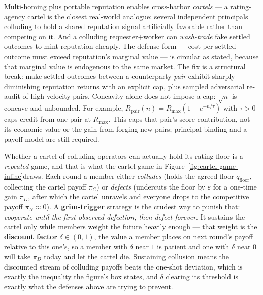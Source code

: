 \documentclass[11pt,a4paper]{article}
\theoremstyle{definition}
\theoremstyle{definition}
\theoremstyle{remark}
\begin{document}
Multi-homing plus portable reputation enables cross-harbor \emph{cartels} --- a
rating-agency cartel is the closest real-world analogue: several independent
principals colluding to hold a shared reputation signal artificially favorable
rather than competing on it. And a colluding requester$+$worker can
\emph{wash-trade} fake settled
outcomes to mint reputation cheaply. The defense form --- cost-per-settled-outcome
must exceed reputation's marginal value --- is circular as stated, because that
marginal value is endogenous to the same market. The fix is a structural break:
make settled outcomes between a counterparty \emph{pair} exhibit sharply diminishing
reputation returns with an explicit cap, plus sampled adversarial re-audit
of high-velocity pairs. Concavity alone does not impose a cap: $\sqrt n$ is
concave and unbounded. For example, $R_{\mathrm{pair}}(n)=R_{\max}(1-e^{-n/\tau})$
with $\tau>0$ caps credit from one pair at $R_{\max}$. This caps that pair's
score contribution, not its economic value or the gain from forging new pairs;
principal binding and a payoff model are still required.

Whether a cartel of colluding operators can actually hold its rating floor is a
\emph{repeated} game, and that is what \ifpdbook the cartel game in \else Figure~\ref{fig:cartel-game-inline}\fi draws.
Each round a member either \emph{colludes} (holds the agreed floor
$q_{\mathrm{floor}}$, collecting the cartel payoff $\pi_C$) or \emph{defects}
(undercuts the floor by $\varepsilon$ for a one-time gain $\pi_D$, after which the
cartel unravels and everyone drops to the competitive payoff $\pi_N \approx 0$). A
\textbf{grim-trigger} strategy is the crudest way to punish that: \emph{cooperate
until the first observed defection, then defect forever}. It sustains the cartel
only while members weight the future heavily enough --- that weight is the
\textbf{discount factor} $\delta \in (0,1)$, the value a member places on next
round's payoff relative to this one's, so a member with $\delta$ near $1$ is patient
and one with $\delta$ near $0$ will take $\pi_D$ today and let the cartel die.
Sustaining collusion means the discounted stream of colluding payoffs beats the
one-shot deviation, which is exactly the inequality the figure's box states, and
$\delta$ clearing its threshold is exactly what the defenses above are trying to
prevent.

\pdexercisepointer*{\ref{ex:he-phase1-subsidize}}{\ref{ex:he-poa-resale-reframe}}{\pageref{ex:he-phase1-subsidize}}
\end{document}
